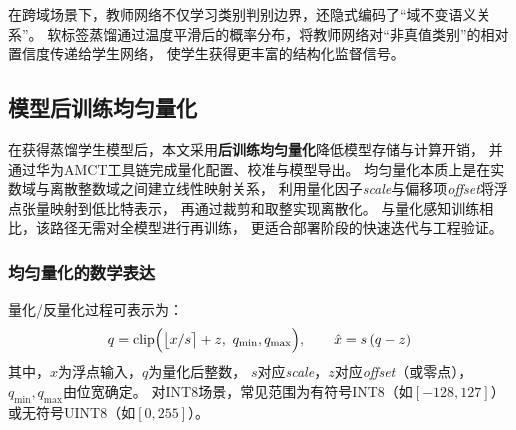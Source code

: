 
在跨域场景下，教师网络不仅学习类别判别边界，还隐式编码了“域不变语义关系”。
软标签蒸馏通过温度平滑后的概率分布，将教师网络对“非真值类别”的相对置信度传递给学生网络，
使学生获得更丰富的结构化监督信号。




\subsection{模型后训练均匀量化}

在获得蒸馏学生模型后，本文采用\textbf{后训练均匀量化}降低模型存储与计算开销，
并通过华为AMCT工具链完成量化配置、校准与模型导出。
均匀量化本质上是在实数域与离散整数域之间建立线性映射关系，
利用量化因子\textit{scale}与偏移项\textit{offset}将浮点张量映射到低比特表示，
再通过裁剪和取整实现离散化。
与量化感知训练相比，该路径无需对全模型进行再训练，
更适合部署阶段的快速迭代与工程验证。

\subsubsection{均匀量化的数学表达}

量化/反量化过程可表示为：
\begin{equation}
q=\mathrm{clip}\Bigl(\bigl\lfloor x/s \bigr\rceil+z,\ q_{\min},q_{\max}\Bigr),
\qquad
\hat{x}=s\,(q-z)
\end{equation}
其中，$x$为浮点输入，$q$为量化后整数，
$s$对应\textit{scale}，$z$对应\textit{offset}（或零点），
$q_{\min},q_{\max}$由位宽确定。
对INT8场景，常见范围为有符号INT8（如$[-128,127]$）或无符号UINT8（如$[0,255]$）。

